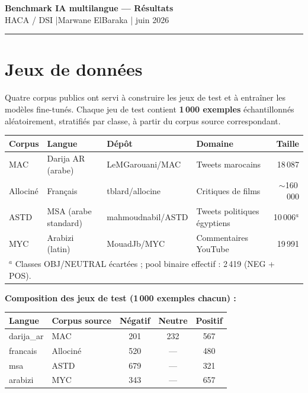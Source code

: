 \documentclass[11pt, a4paper]{article}
\begin{document}
\begin{center}
  {\Large\bfseries\color{hacablue} Benchmark IA multilangue — Résultats}\\[4pt]
  {\normalsize HACA / DSI \quad|\quad Marwane ElBaraka \quad| juin 2026}
\end{center}

\vspace{2pt}\rule{\linewidth}{0.8pt}\vspace{6pt}

\section{Jeux de données}

Quatre corpus publics ont servi à construire les jeux de test et à entraîner les modèles fine-tunés.
Chaque jeu de test contient \textbf{1\,000 exemples} échantillonnés aléatoirement, stratifiés par classe,
à partir du corpus source correspondant.

\vspace{4pt}
\begin{center}
\small
\setlength{\tabcolsep}{6pt}
\begin{tabular}{lllp{3.2cm}r}
\toprule
\textbf{Corpus} & \textbf{Langue} & \textbf{Dépôt} & \textbf{Domaine} & \textbf{Taille} \\
\midrule
MAC      & Darija AR (arabe)    & LeMGarouani/MAC      & Tweets marocains            & 18\,087 \\
Allociné & Français             & tblard/allocine      & Critiques de films          & $\sim$160\,000 \\
ASTD     & MSA (arabe standard) & mahmoudnabil/ASTD    & Tweets politiques égyptiens & 10\,006$^{a}$ \\
MYC      & Arabizi (latin)      & MouadJb/MYC          & Commentaires YouTube        & 19\,991 \\
\bottomrule
\multicolumn{5}{l}{$^{a}$ Classes OBJ/NEUTRAL écartées ; pool binaire effectif : 2\,419 (NEG + POS).}
\end{tabular}
\end{center}

\vspace{2pt}
\textbf{Composition des jeux de test (1\,000 exemples chacun) :}

\vspace{2pt}
\begin{center}
\begin{tabular}{llccc}
\toprule
\textbf{Langue} & \textbf{Corpus source} & \textbf{Négatif} & \textbf{Neutre} & \textbf{Positif} \\
\midrule
darija\_ar  & MAC      & 201 & 232 & 567 \\
francais    & Allociné & 520 &  —  & 480 \\
msa         & ASTD     & 679 &  —  & 321 \\
arabizi     & MYC      & 343 &  —  & 657 \\
\bottomrule
\end{tabular}
\end{center}
\end{document}
